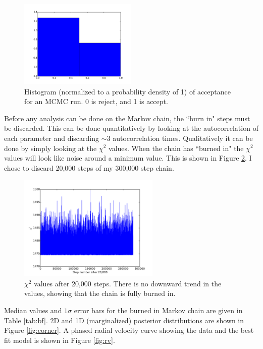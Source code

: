 \documentclass[11pt]{paper}
\begin{document}
\begin{figure}
\begin{center}
    \includegraphics[width=0.5\textwidth]{outputs/acc.pdf}
    \caption{Histogram (normalized to a probability density of 1) of acceptance for an MCMC run. 0 is reject, and 1 is accept.}
    \label{fig:acchist}
\end{center}
\end{figure}

Before any analysis can be done on the Markov chain, the ``burn in" steps must be discarded. This can be done quantitatively by looking at the autocorrelation of each parameter and discarding $\sim3$ autocorrelation times. Qualitatively it can be done by simply looking at the $\chi^2$ values. When the chain has ``burned in" the $\chi^2$ values will look like noise around a minimum value. This is shown in Figure \ref{fig:chi}. I chose to discard 20,000 steps of my 300,000 step chain. 

\begin{figure}
\begin{center}
    \includegraphics[width=0.6\textwidth]{outputs/chiMinusBurn.pdf}
    \caption{$\chi^2$ values after 20,000 steps. There is no downward trend in the values, showing that the chain is fully burned in.}
    \label{fig:chi}
\end{center}
\end{figure}

Median values and $1\sigma$ error bars for the burned in Markov chain are given in Table \ref{tab:bf}. 2D and 1D (marginalized) posterior distributions are shown in Figure \ref{fig:corner}. A phased radial velocity curve showing the data and the best fit model is shown in Figure \ref{fig:rv}. 
\end{document}
